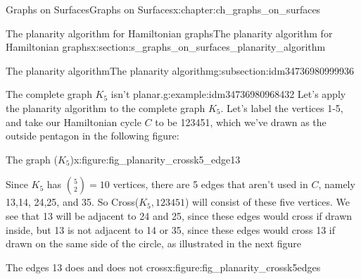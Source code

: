 \documentclass[oneside,10pt,]{book}
\numberwithin{equation}{section}
\begin{document}
\begin{chapterptx}{Graphs on Surfaces}{}{Graphs on Surfaces}{}{}{x:chapter:ch_graphs_on_surfaces}
\begin{sectionptx}{The planarity algorithm for Hamiltonian graphs}{}{The planarity algorithm for Hamiltonian graphs}{}{}{x:section:s_graphs_on_surfaces_planarity_algorithm}
\begin{subsectionptx}{The planarity algorithm}{}{The planarity algorithm}{}{}{g:subsection:idm34736980999936}
\begin{example}{The complete graph \(K_5\) isn't planar.}{g:example:idm34736980968432}%
Let's apply the planarity algorithm to the complete graph \(K_5\).  Let's label the vertices 1-5, and take our Hamiltonian cycle \(C\) to be 123451, which we've drawn as the outside pentagon in the following figure: \begin{figureptx}{The graph (\(K_5\))}{x:figure:fig_planarity_crossk5_edge13}{}%
\begin{image}{0.15}{0.7}{0.15}%
%
\end{image}%
\tcblower
\end{figureptx}%
 Since \(K_5\) has \(\binom{5}{2}=10\) vertices, there are 5 edges that aren't used in \(C\), namely 13,14, 24,25, and 35.  So Cross(\(K_5, 123451\)) will consist of these five vertices.  We see that 13 will be adjacent to 24 and 25, since these edges would cross if drawn inside, but 13 is not adjacent to 14 or 35, since these edges would cross 13 if drawn on the same side of the circle, as illustrated in the next figure%
\begin{figureptx}{The edges 13 does and does not cross}{x:figure:fig_planarity_crossk5edges}{}%
\begin{image}{0.15}{0.7}{0.15}%
\end{image}
\end{figureptx}
\end{example}
\end{subsectionptx}
\end{sectionptx}
\end{chapterptx}
\end{document}
